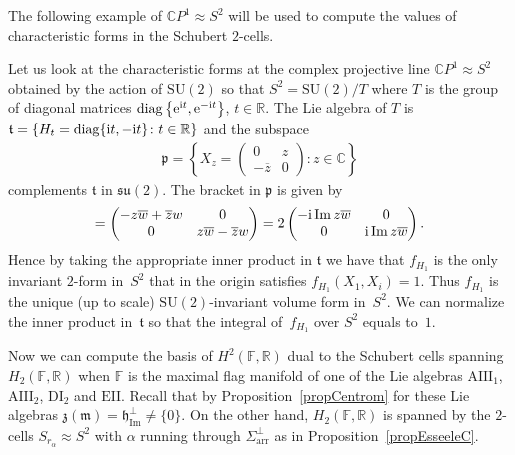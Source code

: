 \documentclass[pdftex]{sigma}
\numberwithin{equation}{section}
\newcommand{\func}[1]{\operatorname{#1}}
\begin{document}
The following example of $\mathbb{C}P^{1}\approx S^{2}$ will be used to compute the values of characteristic forms in the Schubert $2$-cells.

\begin{Example} Let us look at the characteristic forms at the complex projective line $\mathbb{C}P^{1}\approx S^{2}$ obtained by the action of $\mathrm{SU}(2) $ so that $S^{2}=\mathrm{SU}(2) /T$ where $T$ is the group of diagonal matrices $\operatorname{diag}\big\{{\rm e}^{{\rm i}t},{\rm e}^{-{\rm i}t}\big\}$, $t\in \mathbb{R}$. The Lie algebra of $T$ is $\mathfrak{t}=\{H_{t}=\operatorname{diag}\{{\rm i}t,-{\rm i}t\}\colon t\in \mathbb{R}\}$ and the subspace
\begin{gather*}
\mathfrak{p}=\left\{X_{z}=\left(
\begin{matrix}
0 & z \\
-\overline{z} & 0
\end{matrix}%
\right) \colon z\in \mathbb{C}\right\}
\end{gather*}%
complements $\mathfrak{t}$ in $\mathfrak{su}(2) $. The bracket in $\mathfrak{p}$ is given by
\begin{gather*}
[ X_{z},X_{w}] =\left(
\begin{matrix}
-z\overline{w}+\overline{z}w & 0 \\
0 & z\overline{w}-\overline{z}w
\end{matrix}%
\right) =2\left(
\begin{matrix}
-{\rm i}\func{Im}z\overline{w} & 0 \\
0 & {\rm i}\func{Im}z\overline{w}
\end{matrix}
\right).
\end{gather*}
Hence by taking the appropriate inner product in $\mathfrak{t}$ we have that $f_{H_{1}}$ is the only invariant $2$-form in~$S^{2}$ that in the origin satisfies $f_{H_{1}} ( X_{1},X_{i} ) =1$. Thus $f_{H_{1}}$ is the unique (up to scale) $\mathrm{SU}(2) $-invariant volume form in~$S^{2}$. We can normalize the inner product in~$\mathfrak{t}$ so that the integral of~$f_{H_{1}}$ over $S^{2}$ equals to~$1$.
\end{Example}

Now we can compute the basis of $H^{2}( \mathbb{F},\mathbb{R}) $ dual to the Schubert cells spanning $H_{2} ( \mathbb{F},\mathbb{R} ) $ when $\mathbb{F}$ is the maximal flag manifold of one of the Lie algebras $\mathrm{AIII}_{1}$, $\mathrm{AIII}_{2}$, $\mathrm{DI}_{2}$ and $\mathrm{EII}$. Recall that by Proposition~\ref{propCentrom} for these Lie algebras $\mathfrak{z}(\mathfrak{m}) =\mathfrak{h}_{\func{Im}}^{\bot }\neq \{0\}$. On the other hand, $H_{2} ( \mathbb{F},\mathbb{R} ) $ is spanned by the $2$-cells $S_{r_{\alpha }}\approx S^{2}$ with $\alpha $ running through $\Sigma _{\mathrm{arr}}^{\bot }$ as in Proposition~\ref{propEsseeleC}.
\end{document}
